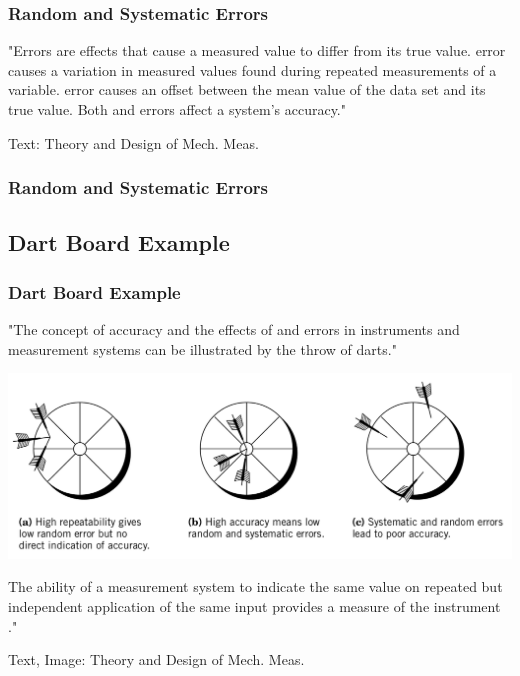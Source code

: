 \documentclass[fleqn]{beamer} %
\newcommand{\sectionIIsubsectionItitle}{Random and Systematic Errors}
\newcommand{\sectionIIsubsectionIItitle}{Dart Board Example}
\begin{document}
			\begin{frame}[label=sectionIIsubsectionI]
				\frametitle{\sectionIIsubsectionItitle}

				"Errors are effects that cause a  measured value to differ from its true value. \hspcu error causes a
				\hspcu variation in measured values found during repeated measurements of a variable. \vspc
				\hspcu error causes an offset between the mean value of the data set and its true value. Both \hspcu and
				\hspcu errors affect a system's accuracy."

				\vspace{10mm}
				{\tiny Text: Theory and Design of Mech. Meas.}

			\end{frame}

		    \begin{frame}[label=sectionIIsubsectionI]
				\frametitle{\sectionIIsubsectionItitle}





			\end{frame}	

		\subsection{\sectionIIsubsectionIItitle}\label{sectionIIsubsectionII}

			\begin{frame}
				\frametitle{\sectionIIsubsectionIItitle}
				"The concept of accuracy and the effects of \hspcu and \hspcu errors in instruments
				and measurement systems can be illustrated by the throw of darts."

				\includegraphics[scale=.20]{images/dart_throw.png}

				The ability of a measurement system to indicate the same value on repeated but independent
				application of the same input provides a measure of the instrument \hspcu."

				{\tiny Text, Image: Theory and Design of Mech. Meas.}

			\end{frame}
\end{document}

